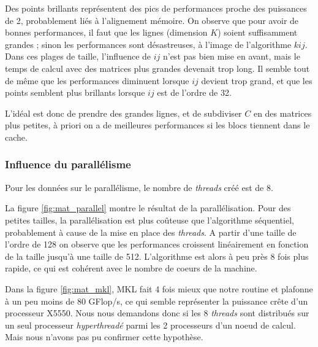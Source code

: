 Des points brillants représentent des pics de performances proche des puissances de 2, probablement liés à l'alignement mémoire. On observe que pour avoir de bonnes performances, il faut que les lignes (dimension $K$) soient suffisamment grandes ; sinon les performances sont désastreuses, à l'image de l'algorithme $kij$. Dans ces plages de taille, l'influence de $ij$ n'est pas bien mise en avant, mais le temps de calcul avec des matrices plus grandes devenait trop long. Il semble tout de même que les performances diminuent lorsque $ij$ devient trop grand, et que les points semblent plus brillants lorsque $ij$ est de l'ordre de 32. 
    
L'idéal est donc de prendre des grandes lignes, et de subdiviser $C$ en des matrices plus petites, à priori on a de meilleures performances si les blocs tiennent dans le cache.
    
    
\subsubsection{Influence du parallélisme}

Pour les données sur le parallélisme, le nombre de \emph{threads} créé est de 8.

La figure \ref{fig:mat_parallel} montre le résultat de la parallélisation. Pour des petites tailles, la parallélisation est plus coûteuse que l'algorithme séquentiel, probablement à cause de la mise en place des \emph{threads}. A partir d'une taille de l'ordre de 128 on observe que les performances croissent linéairement en fonction de la taille jusqu'à une taille de 512. L'algorithme est alors à peu près 8 fois plus rapide, ce qui est cohérent avec le nombre de coeurs de la machine.
    
Dans la figure \ref{fig:mat_mkl}, MKL fait 4 fois mieux que notre routine et plafonne à un peu moins de 80 GFlop/s, ce qui semble représenter la puissance crête d'un processeur X5550. Nous nous demandons donc si les 8 \emph{threads} sont distribués sur un seul processeur \emph{hyperthreadé} parmi les 2 processeurs d'un noeud de calcul. Mais nous n'avons pas pu confirmer cette hypothèse.
    
    